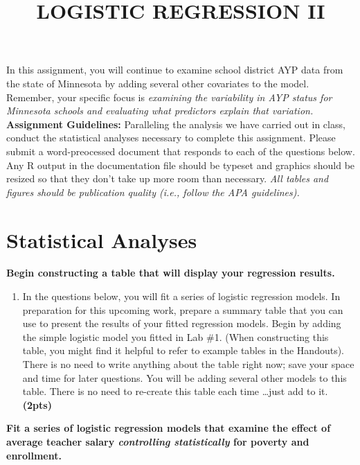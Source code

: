 \documentclass[]{article}
\title{LOGISTIC REGRESSION II}
\author{}
\date{}
\begin{document}
\maketitle 
\thispagestyle{fancy}

\noindent In this assignment, you will continue to examine school district AYP data from the state of Minnesota by adding several other covariates to the model. Remember, your specific focus is \textit{examining the variability in AYP status for Minnesota schools and evaluating what predictors explain that variation.} 
\\
\linebreak
\noindent \textbf{Assignment Guidelines:} Paralleling the analysis we have carried out in class, conduct the statistical analyses necessary to complete this assignment. Please submit a word-preocessed document that responds to each of the questions below. Any R output in the documentation file should be typeset and graphics should be resized so that they don't take up more room than necessary. \textit{All tables and figures should be publication quality (i.e., follow the APA guidelines).}



\section*{Statistical Analyses}

\noindent\textbf{Begin constructing a table that will display your regression results.}

\begin{enumerate}[resume]
\item In the questions below, you will fit a series of logistic regression models. In preparation for this upcoming work, prepare a summary table that you can use to present the results of your fitted regression models. Begin by adding the simple logistic model you fitted in Lab \#1. (When constructing this table, you might find it helpful to refer to example tables in the Handouts). There is no need to write anything about the table right now; save your space and time for later questions. You will be adding several other models to this table. There is no need to re-create this table each time \ldots just add to it. \textbf{(2pts)} 
\end{enumerate}

\pagebreak

\noindent\textbf{Fit a series of logistic regression models that examine the effect of average teacher salary \textit{controlling statistically} for poverty and enrollment.}
\end{document}
